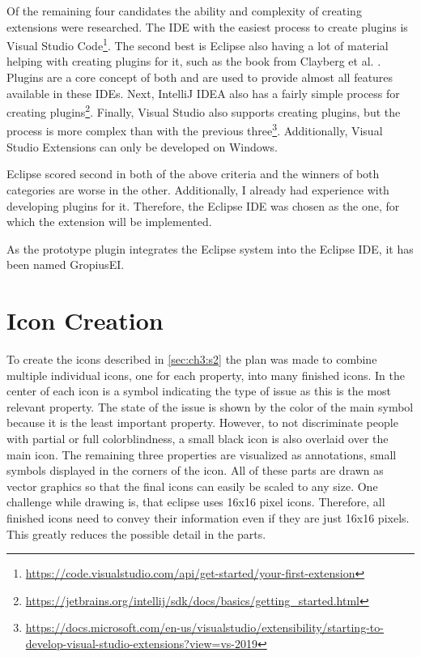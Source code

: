 Of the remaining four candidates the ability and complexity of creating extensions were researched.
The \gls{IDE} with the easiest process to create plugins is Visual Studio Code\footnote{\url{https://code.visualstudio.com/api/get-started/your-first-extension}}.
The second best is \gls{Eclipse} also having a lot of material helping with creating plugins for it, such as the book from Clayberg et al. \cite{clayberg2006eclipse}.
Plugins are a core concept of both and are used to provide almost all features available in these \glspl{IDE}.
Next, IntelliJ IDEA also has a fairly simple process for creating plugins\footnote{\url{https://jetbrains.org/intellij/sdk/docs/basics/getting_started.html}}.
Finally, Visual Studio also supports creating plugins, but the process is more complex than with the previous three\footnote{\url{https://docs.microsoft.com/en-us/visualstudio/extensibility/starting-to-develop-visual-studio-extensions?view=vs-2019}}.
Additionally, Visual Studio Extensions can only be developed on Windows.

\Gls{Eclipse} scored second in both of the above criteria and the winners of both categories are worse in the other.
Additionally, I already had experience with developing plugins for it.
Therefore, the \gls{Eclipse} \gls{IDE} was chosen as the one, for which the extension will be implemented.

As the prototype plugin integrates the \gls{Eclipse} system into the \gls{Eclipse} \gls{IDE}, it has been named \gls{GropiusEI}.

\section{Icon Creation}
\label{sec:ch4:s2}
To create the icons described in \cref{sec:ch3:s2} the plan was made to combine multiple individual icons, one for each property, into many finished icons.
In the center of each icon is a symbol indicating the type of issue as this is the most relevant property.
The state of the issue is shown by the color of the main symbol because it is the least important property.
However, to not discriminate people with partial or full colorblindness, a small black icon is also overlaid over the main icon.
The remaining three properties are visualized as annotations, small symbols displayed in the corners of the icon.
All of these parts are drawn as vector graphics so that the final icons can easily be scaled to any size.
One challenge while drawing is, that eclipse uses 16x16 pixel icons.
Therefore, all finished icons need to convey their information even if they are just 16x16 pixels.
This greatly reduces the possible detail in the parts.


